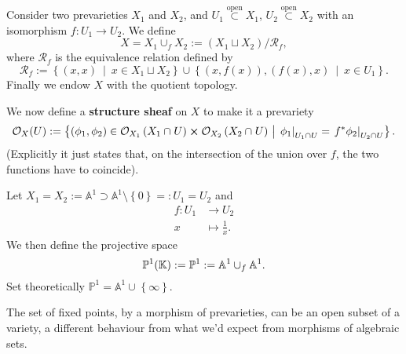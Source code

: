 \begin{defn}
	Consider two prevarieties $X_1$ and $X_2$, and $U_1 \stackrel{\text{open}}{\subset} X_1$, $U_2 \stackrel{\text{open}}{\subset} X_2$ with an isomorphism $f: U_1 \to U_2$.
	We define
	\begin{equation}
		X = X_1 \cup_{f} X_2 := \left(X_1 \sqcup X_2 \right) / \mathcal{R}_f
	,\end{equation} 
	where $\mathcal{R}_f$ is the equivalence relation defined by
	\begin{equation}
		\mathcal{R}_f := \left\{ \left(x, x\right) \ \middle|\ x \in X_1 \sqcup X_2 \right\} \cup 
		\left\{ \left(x, f(x)\right), \left(f(x), x \right) \ \middle|\ x \in U_1 \right\}
	.\end{equation} 
	Finally we endow $X$ with the quotient topology.

	We now define a \textbf{structure sheaf} on $X$ to make it a prevariety
	\begin{equation}
		\mathcal{O}_X(U) := \left\{ \left(\phi_1, \phi_2\right) \in  \mathcal{O}_{X_1}
		\left( X_1 \cap_{} U \right) \cross \mathcal{O}_{X_2} \left( X_2 \cap_{} U \right)
		\ \middle|\ \left.\phi_1\right|_{U_1 \cap U}
		= \left.f^* \phi_2\right|_{U_2 \cap U}  \right\}
	.\end{equation} 
	(Explicitly it just states that, on the intersection of the union over $f$, the two functions have to coincide).
\end{defn}

\begin{ex}
	Let $X_1 = X_2 := \mathbb{A}^1 \supset \mathbb{A}^1 \setminus \left\{ 0 \right\} =: U_1 = U_2$ 
	and
	 \begin{align}
		f: U_1 &\to U_2 \\
		x &\mapsto \frac{1}{x}
	.\end{align} 
	We then define the projective space
	 \begin{equation}
		 \mathbb{P}^1(\mathbb{K}) := \mathbb{P}^1 := \mathbb{A}^1 \cup_{f} \mathbb{A}^1
	.\end{equation} 
	Set theoretically $\mathbb{P}^1 = \mathbb{A}^1 \cup_{} \left\{ \infty \right\} $.
\end{ex} 
\begin{rem}
	The set of fixed points, by a morphism of prevarieties, can be an open subset of a variety, a different behaviour from what we'd expect from morphisms of algebraic sets.
\end{rem} 

